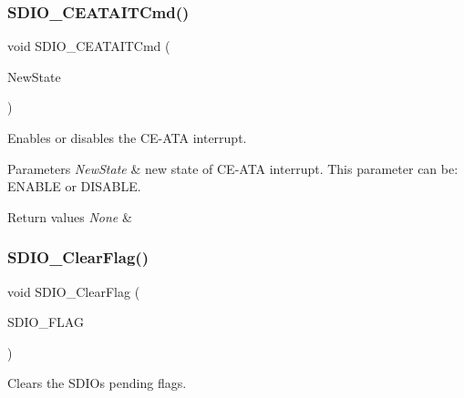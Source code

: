 \subsubsection{\texorpdfstring{SDIO\_CEATAITCmd()}{SDIO\_CEATAITCmd()}}
{\footnotesize\ttfamily void S\+D\+I\+O\+\_\+\+C\+E\+A\+T\+A\+I\+T\+Cmd (\begin{DoxyParamCaption}\item[{\mbox{\hyperlink{group___exported__types_gac9a7e9a35d2513ec15c3b537aaa4fba1}{Functional\+State}}}]{New\+State }\end{DoxyParamCaption})}



Enables or disables the C\+E-\/\+A\+TA interrupt. 


\begin{DoxyParams}{Parameters}
{\em New\+State} & new state of C\+E-\/\+A\+TA interrupt. This parameter can be\+: E\+N\+A\+B\+LE or D\+I\+S\+A\+B\+LE. \\
\hline
\end{DoxyParams}

\begin{DoxyRetVals}{Return values}
{\em None} & \\
\hline
\end{DoxyRetVals}
\mbox{\label{group___s_d_i_o___private___functions_ga7aff4efdeb528229135f9f285e53518a}} 
\subsubsection{\texorpdfstring{SDIO\_ClearFlag()}{SDIO\_ClearFlag()}}
{\footnotesize\ttfamily void S\+D\+I\+O\+\_\+\+Clear\+Flag (\begin{DoxyParamCaption}\item[{uint32\+\_\+t}]{S\+D\+I\+O\+\_\+\+F\+L\+AG }\end{DoxyParamCaption})}



Clears the S\+D\+IO\textquotesingle{}s pending flags. 


